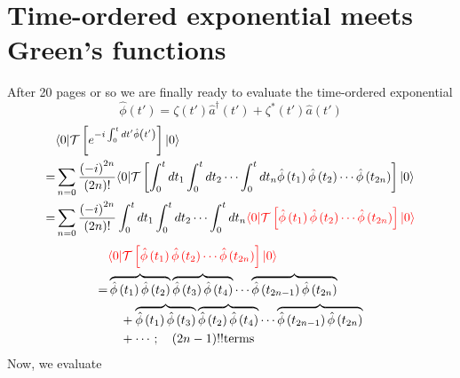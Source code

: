 \section{Time-ordered exponential meets Green's functions}

After 20 pages or so we are finally ready to evaluate the time-ordered exponential
\[ \hat{\phi}\left( t' \right) =\zeta \left( t' \right) \hat{a}^{\dagger}\left( t' \right) +\zeta ^*\left( t' \right) \hat{a}\left( t' \right) \]
\begin{align*}
    &\langle 0|\mathcal{T} \left[ e^{-i\int_0^t{dt'\hat{\phi}\left( t' \right)}} \right] |0\rangle \\
    =&\sum_{n=0}{\frac{\left( -i \right) ^{2n}}{\left( 2n \right) !}\langle 0|\mathcal{T} \left[ \int_0^t{dt_1\int_0^t{dt_2\cdots \int_0^t{dt_n\hat{\phi}\left( t_1 \right) \hat{\phi}\left( t_2 \right) \cdots \hat{\phi}\left( t_{2n} \right)}}} \right] |0\rangle}\\
    =&\sum_{n=0}{\frac{\left( -i \right) ^{2n}}{\left( 2n \right) !}\int_0^t{dt_1\int_0^t{dt_2\cdots \int_0^t{dt_n{\color{red} \langle 0|\mathcal{T} \left[ \hat{\phi}\left( t_1 \right) \hat{\phi}\left( t_2 \right) \cdots \hat{\phi}\left( t_{2n} \right) \right] |0\rangle }}}}}
\end{align*}
\begin{align*}
    &{\color{red} \langle 0|\mathcal{T} \left[ \hat{\phi}\left( t_1 \right) \hat{\phi}\left( t_2 \right) \cdots \hat{\phi}\left( t_{2n} \right) \right] |0\rangle }\\
    =&\overbrace{\hat{\phi}\left( t_1 \right) \hat{\phi}\left( t_2 \right) }\overbrace{\hat{\phi}\left( t_3 \right) \hat{\phi}\left( t_4 \right) }\cdots \overbrace{\hat{\phi}\left( t_{2n-1} \right) \hat{\phi}\left( t_{2n} \right) }\\
    &\quad+\overbrace{\hat{\phi}\left( t_1 \right) \hat{\phi}\left( t_3 \right) }\overbrace{\hat{\phi}\left( t_2 \right) \hat{\phi}\left( t_4 \right) }\cdots \overbrace{\hat{\phi}\left( t_{2n-1} \right) \hat{\phi}\left( t_{2n} \right) }\\
    &\quad+\cdots ;\quad \left( 2n-1 \right) !! \mathrm{terms}
\end{align*}
Now, we evaluate

